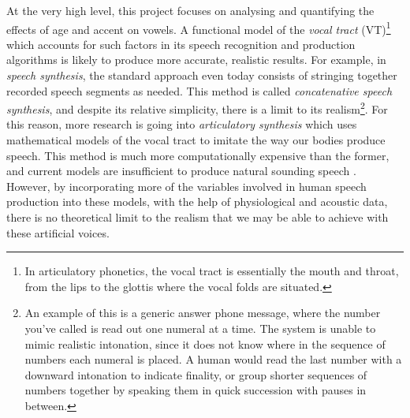 At the very high level, this project focuses on analysing and quantifying the effects of age and accent on vowels. A functional model of the \textit{vocal tract} (VT)\footnote{In articulatory phonetics, the vocal tract is essentially the mouth and throat, from the lips to the glottis where the vocal folds are situated.} which accounts for such factors in its speech recognition and production algorithms is likely to produce more accurate, realistic results. For example, in \textit{speech synthesis}, the standard approach even today consists of stringing together recorded speech segments as needed. This method is called \textit{concatenative speech synthesis}, and despite its relative simplicity, there is a limit to its realism\footnote{An example of this is a generic answer phone message, where the number you've called is read out one numeral at a time. The system is unable to mimic realistic intonation, since it does not know where in the sequence of numbers each numeral is placed. A human would read the last number with a downward intonation to indicate finality, or group shorter sequences of numbers together by speaking them in quick succession with pauses in between.}\cite{shadle2002prospects}. For this reason, more research is going into \textit{articulatory synthesis} which uses mathematical models of the vocal tract to imitate the way our bodies produce speech. This method is much more computationally expensive than the former, and current models are insufficient to produce natural sounding speech \cite{gray2005}. However, by incorporating more of the variables involved in human speech production into these models, with the help of physiological and acoustic data, there is no theoretical limit to the realism that we may be able to achieve with these artificial voices.